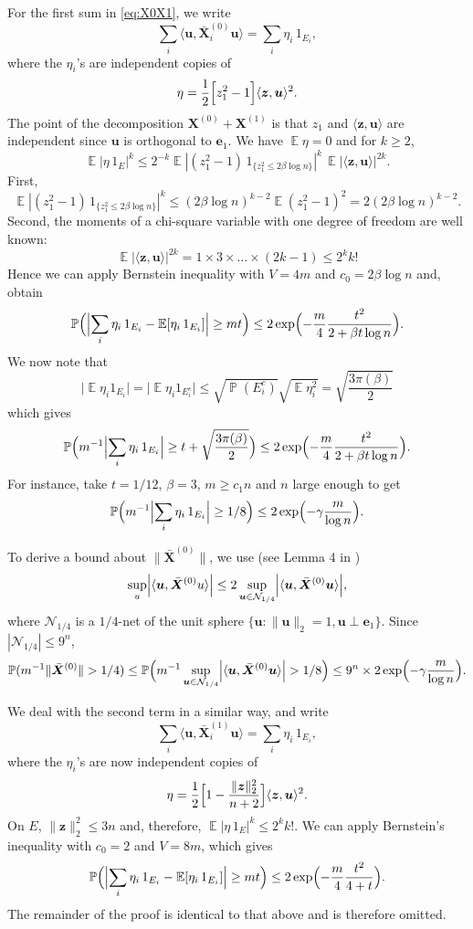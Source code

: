 \documentclass[11pt]{article}
\newcommand{\<}{\langle}
\renewcommand{\>}{\rangle}
\renewcommand{\P}{\operatorname{\mathbb{P}}}
\newcommand{\E}{\operatorname{\mathbb{E}}}
\newcommand{\bX}{\bm{X}}
\newcommand{\bu}{\bm{u}}
\newcommand{\be}{\bm{e}}
\newcommand{\bz}{\bm{z}}
\numberwithin{equation}{section}
\begin{document}
For the first sum in \eqref{eq:X0X1}, we write
\[
\sum_i \<\bu, \bar{\bX}_i^{(0)} \bu\> = \sum_i \eta_i \, 1_{E_i}, 
\]
where the $\eta_i$'s are independent copies of 
\[
\eta = \frac12 \Bigl[z_1^2 - 1\Bigr] \<\bz, \bu\>^2.
\]
The point of the decomposition $\bX^{(0)} + \bX^{(1)}$ is that $z_1$ and
$\<\bz,\bu\>$ are independent since $\bu$ is orthogonal to $\be_1$.   We have
$\E \eta = 0$ and for $k \ge 2$,
\[
\E |\eta \, 1_{E}|^k \le 2^{-k} \E |(z_1^2 - 1) \, 1_{\{z_1^2 \le
  2\beta \log n\}}|^k \, \E |\<\bz,\bu\>|^{2k}.
\]
First, 
\[
\E |(z_1^2 - 1) \, 1_{\{z_1^2 \le 2\beta \log n\}}|^k \le (2\beta \log
n)^{k-2} \E (z_1^2 -1)^2 = 2 (2\beta \log n)^{k-2}.
\]
Second, the moments of a chi-square variable with one degree of
freedom are well known: 
\[
\E |\<\bz,\bu\>|^{2k} = 1 \times 3 \times \ldots \times (2k-1) \le 2^k k!
\]
Hence we can apply Bernstein inequality with $V = 4m$ and $c_0 =
2\beta \log n$ and, obtain
\[
\P\Bigl(\Bigl\vert\sum_i \eta_i \, 1_{E_i} - \E [\eta_i \,
1_{E_i}]\Bigr\vert \ge mt\Bigr) \le 2 \exp\Bigl(-\frac{m}{4}
\frac{t^2}{2 + \beta t \log n}\Bigr).
\]
We now note that
\[
\vert \E \eta_i 1_{E_i}\vert = \vert \E \eta_i 1_{E_i^c}\vert \le
\sqrt{\P(E_i^c)} \sqrt{\E \eta_i^2} = \sqrt{\frac{3\pi(\beta)}{2}}
\]
which gives
\[
\P\Bigl(m^{-1}\Bigl\vert\sum_i \eta_i \, 1_{E_i} \Bigr\vert \ge t +
\sqrt{\frac{3\pi(\beta)}{2}}\Bigr) \le 2 \exp\Bigl(-\frac{m}{4}
\frac{t^2}{2 + \beta t \log n}\Bigr).
\]
For instance, take $t = 1/12$, $\beta = 3$, $m \geq c_1 n$ and $n$
large enough to get
\[
\P\Bigl(m^{-1} \Bigl\vert\sum_i \eta_i \, 1_{E_i} \Bigr\vert \ge 1/8 \Bigr) \le 2 \exp\Bigl(-\gamma \frac{m}{\log n}\Bigr).
\]

To derive a bound about $\|\bar{\bX}^{(0)}\|$, we use (see Lemma 4 in
\cite{VershyninRMT})
\[
\sup_u \Bigl\vert \<\bu, \bar{\bX}^{(0)} u\>\Bigr\vert \le 2 \sup_{\bu \in
  \mathcal{N}_{1/4}} \Bigl\vert \<\bu, \bar{\bX}^{(0)} \bu\>\Bigr\vert, 
\]
where $ \mathcal{N}_{1/4}$ is a $1/4$-net of the unit sphere $\{\bu :
\|\bu\|_2 = 1, \bu \perp \be_1\}$.  Since $|\mathcal{N}_{1/4}| \le
9^n$,
\[
\P(m^{-1}\|\bar{\bX}^{(0)}\| > 1/4) \le \P\Bigl(m^{-1} \sup_{\bu \in
  \mathcal{N}_{1/4}} \Bigl\vert \<\bu, \bar{\bX}^{(0)} \bu\>
\Bigr\vert > 1/8 \Bigr) \le 9^n \times 2\exp\Bigl(-\gamma
\frac{m}{\log n}\Bigr).
\]

We deal with the second term in a similar way, and write 
\[
\sum_i \<\bu, \bar{\bX}_i^{(1)} \bu\> = \sum_i \eta_i \, 1_{E_i}, 
\]
where the $\eta_i$'s are now independent copies of
\[
\eta = \frac12 \Bigl[1 - \frac{\|\bz\|^2_2}{n+2}\Bigr] \<\bz, \bu\>^2.
\]
On $E$, $\|\bz\|_2^2 \le 3n$ and, therefore, $\E |\eta \, 1_E|^k \le
2^{k} k!$. We can apply Bernstein's inequality with $c_0 = 2$ and $V =
8m$, which gives
\[
\P\Bigl(\Bigl\vert\sum_i \eta_i \, 1_{E_i} - \E [\eta_i \,
1_{E_i}]\Bigr\vert \ge mt\Bigr) \le 2 \exp\Bigl(-\frac{m}{4} \frac{t^2}{4 +
   t}\Bigr).
\]
The remainder of the proof is identical to that above and is therefore omitted.
\end{document}

